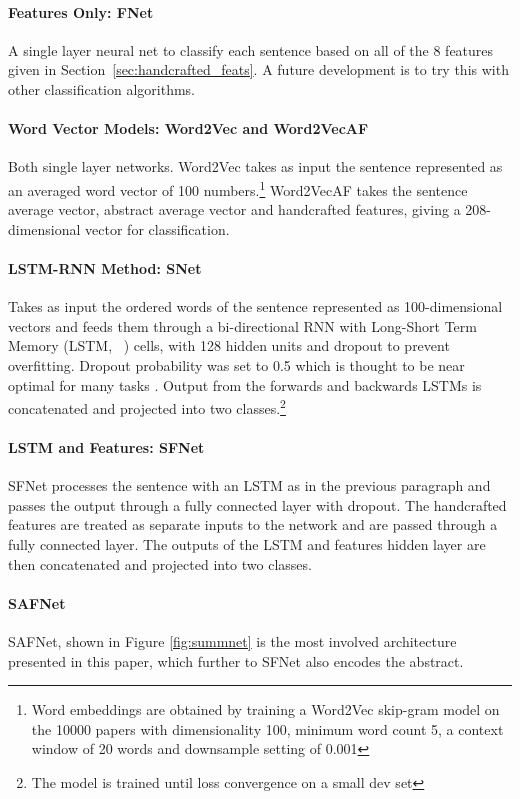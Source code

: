 \documentclass[11pt,a4paper]{article}
\begin{document}
\paragraph{Features Only: FNet} 
\label{sec:fnet}
A single layer neural net to classify each sentence based on all of the 8 features given in Section~\ref{sec:handcrafted_feats}. A future development is to try this with other classification algorithms.

\paragraph{Word Vector Models: Word2Vec and Word2VecAF}
Both single layer networks. Word2Vec takes as input the sentence represented as an averaged word vector of 100 numbers.\footnote{Word embeddings are obtained by training a Word2Vec skip-gram model on the 10000 papers with dimensionality 100, minimum word count 5, a context window of 20 words and downsample setting of 0.001} Word2VecAF takes the sentence average vector, abstract average vector and handcrafted features, giving a 208-dimensional vector for classification.

\paragraph{LSTM-RNN Method: SNet}
\label{sec:lstm}
Takes as input the ordered words of the sentence represented as 100-dimensional vectors and feeds them through a bi-directional RNN with Long-Short Term Memory (LSTM, ~) cells, with 128 hidden units and dropout to prevent overfitting. Dropout probability was set to 0.5 which is thought to be near optimal for many tasks \citep{Srivastava2014}. Output from the forwards and backwards LSTMs is concatenated and projected into two classes.\footnote{The model is trained until loss convergence on a small dev set}

\paragraph{LSTM and Features: SFNet}
SFNet processes the sentence with an LSTM as in the previous paragraph and passes the output through a fully connected layer with dropout. The handcrafted features are treated as separate inputs to the network and are passed through a fully connected layer. The outputs of the LSTM and features hidden layer are then concatenated and projected into two classes.

\paragraph{SAFNet}
SAFNet, shown in Figure \ref{fig:summnet} is the most involved architecture presented in this paper, which further to SFNet also encodes the abstract. 
\end{document}
